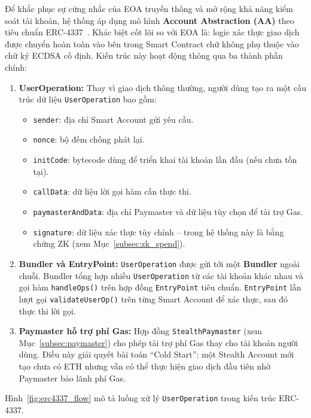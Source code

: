 \documentclass[../DoAn.tex]{subfiles}
\begin{document}
Để khắc phục sự cứng nhắc của EOA truyền thống và mở rộng khả năng kiểm soát tài khoản, hệ thống áp dụng mô hình \textbf{Account Abstraction (AA)} theo tiêu chuẩn ERC-4337~\cite{erc4337}. Khác biệt cốt lõi so với EOA là: logic xác thực giao dịch được chuyển hoàn toàn vào bên trong Smart Contract chứ không phụ thuộc vào chữ ký ECDSA cố định. Kiến trúc này hoạt động thông qua ba thành phần chính:

\begin{enumerate}
    \item \textbf{UserOperation:} Thay vì giao dịch thông thường, người dùng tạo ra một cấu trúc dữ liệu \texttt{UserOperation} bao gồm:
    \begin{itemize}
        \item \texttt{sender}: địa chỉ Smart Account gửi yêu cầu.
        \item \texttt{nonce}: bộ đếm chống phát lại.
        \item \texttt{initCode}: bytecode dùng để triển khai tài khoản lần đầu (nếu chưa tồn tại).
        \item \texttt{callData}: dữ liệu lời gọi hàm cần thực thi.
        \item \texttt{paymasterAndData}: địa chỉ Paymaster và dữ liệu tùy chọn để tài trợ Gas.
        \item \texttt{signature}: dữ liệu xác thực tùy chỉnh -- trong hệ thống này là bằng chứng ZK (xem Mục~\ref{subsec:zk_spend}).
    \end{itemize}

    \item \textbf{Bundler và EntryPoint:} \texttt{UserOperation} được gửi tới một \textbf{Bundler} ngoài chuỗi. Bundler tổng hợp nhiều \texttt{UserOperation} từ các tài khoản khác nhau và gọi hàm \texttt{handleOps()} trên hợp đồng \texttt{EntryPoint} tiêu chuẩn. \texttt{EntryPoint} lần lượt gọi \texttt{validateUserOp()} trên từng Smart Account để xác thực, sau đó thực thi lời gọi.

    \item \textbf{Paymaster hỗ trợ phí Gas:} Hợp đồng \texttt{StealthPaymaster} (xem Mục~\ref{subsec:paymaster}) cho phép tài trợ phí Gas thay cho tài khoản người dùng. Điều này giải quyết bài toán ``Cold Start'': một Stealth Account mới tạo chưa có ETH nhưng vẫn có thể thực hiện giao dịch đầu tiên nhờ Paymaster bảo lãnh phí Gas.
\end{enumerate}

Hình~\ref{fig:erc4337_flow} mô tả luồng xử lý \texttt{UserOperation} trong kiến trúc ERC-4337.
\end{document}
